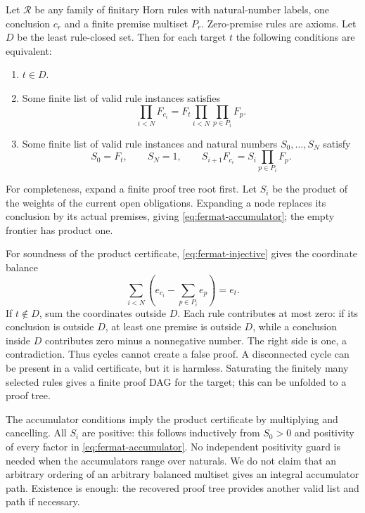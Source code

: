 Let $\mathcal R$ be any family of finitary Horn rules with natural-number
labels, one conclusion $c_r$ and a finite premise multiset $P_r$.
Zero-premise rules are axioms. Let $D$ be the least rule-closed set.
Then for each target $t$ the following conditions are equivalent:
\begin{enumerate}
 \item $t\in D$.
 \item Some finite list of valid rule instances satisfies
 \begin{equation}\label{eq:fermat-product}
  \prod_{i<N}F_{c_i}
    =F_t\prod_{i<N}\prod_{p\in P_i}F_p.
 \end{equation}
 \item Some finite list of valid rule instances and natural numbers
 $S_0,\ldots,S_N$ satisfy
 \begin{equation}\label{eq:fermat-accumulator}
  S_0=F_t,\qquad S_N=1,\qquad
  S_{i+1}F_{c_i}=S_i\prod_{p\in P_i}F_p.
 \end{equation}
\end{enumerate}

For completeness, expand a finite proof tree root first. Let $S_i$ be
the product of the weights of the current open obligations. Expanding a
node replaces its conclusion by its actual premises, giving
\eqref{eq:fermat-accumulator}; the empty frontier has product one.

For soundness of the product certificate,
\eqref{eq:fermat-injective} gives the coordinate balance
\[
 \sum_{i<N}\left(e_{c_i}-\sum_{p\in P_i}e_p\right)=e_t.
\]
If $t\notin D$, sum the coordinates outside $D$. Each rule contributes
at most zero: if its conclusion is outside $D$, at least one premise is
outside $D$, while a conclusion inside $D$ contributes zero minus a
nonnegative number. The right side is one, a contradiction. Thus cycles
cannot create a false proof. A disconnected cycle can be present in a
valid certificate, but it is harmless. Saturating the finitely many
selected rules gives a finite proof DAG for the target; this can be
unfolded to a proof tree.

The accumulator conditions imply the product certificate by multiplying
and cancelling. All $S_i$ are positive: this follows inductively from
$S_0>0$ and positivity of every factor in
\eqref{eq:fermat-accumulator}. No independent positivity guard is needed
when the accumulators range over naturals. We do not claim that an
arbitrary ordering of an arbitrary balanced multiset gives an integral
accumulator path. Existence is enough: the recovered proof tree provides
another valid list and path if necessary.

